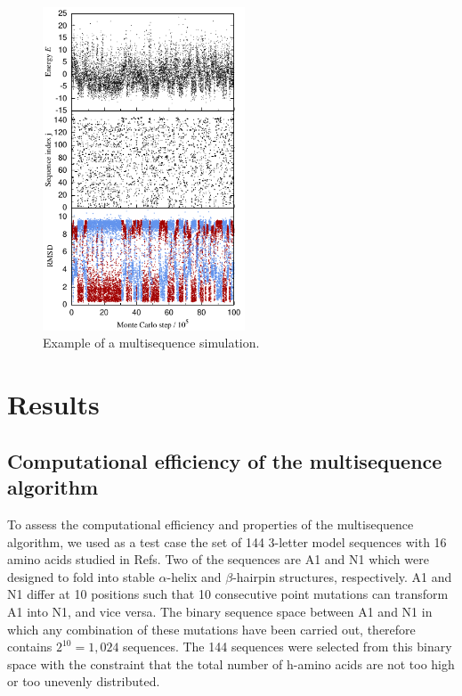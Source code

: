 \documentclass[%
 aip,
rsi,%
 amsmath,amssymb,
 reprint,%
]{revtex4-1}
\begin{document}
\begin{figure}
\includegraphics[width=6.0cm]{MCtraj}
\caption{Example of a multisequence simulation.}
\end{figure}

%
%
%
%

\section{Results}

\subsection{Computational efficiency of the multisequence algorithm}
\noindent
To assess the computational efficiency and properties of the multisequence algorithm, we used as a test case the set of 144 3-letter model sequences with 16 amino acids studied in Refs.\cite{Holzgrafe2014} Two of the sequences are A1 and N1 which were designed to fold into stable $\alpha$-helix and $\beta$-hairpin structures, respectively. A1 and N1 differ at 10 positions such that 10 consecutive point mutations can transform A1 into N1, and vice versa. The binary sequence space between A1 and N1 in which any combination of these mutations have been carried out, therefore contains $2^{10}=1,024$ sequences. The 144 sequences were selected from this binary space with the constraint that the total number of h-amino acids are not too high or too unevenly distributed.~\cite{Holzgrafe2014}
\end{document}
